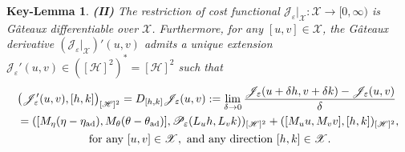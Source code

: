 \documentclass{sinst}
\numberwithin{equation}{section}
\theoremstyle{plain}
\newtheorem{keylem}{Key-Lemma}
\theoremstyle{definition}
\def\sH{\mathscr{H}}
\def\sJ{\mathscr{J}}
\def\sP{\mathscr{P}}
\def\sX{\mathscr{X}}
\begin{document}
\begin{keylem}
  \noindent
  \textbf{(II)} The restriction of cost functional $\sJ_\varepsilon|_\sX:\sX \longrightarrow [0,\infty)$ is G\^{a}teaux differentiable over $\sX$. Furthermore, for any $[u,v] \in \sX$, the G\^{a}teaux derivative $(\sJ_\varepsilon|_\sX)'(u,v)$ admits a unique extension $\sJ_\varepsilon'(u,v) \in ([\sH]^2)^* = [\sH]^2$ such that
  \begin{gather}
    \begin{aligned}
      &\bigl(\sJ_\varepsilon'(u,v), [h,k] \bigr)_{[\sH]^2} = D_{[h,k]} \sJ_\varepsilon(u,v) := \lim_{\delta \to 0} \frac{\sJ_\varepsilon(u + \delta h, v + \delta k) - \sJ_\varepsilon(u,v)}{\delta}
      \\
      &= ([M_\eta(\eta - \eta_{\rm ad}), M_\theta(\theta - \theta_{\rm ad})], \sP_\varepsilon(L_u h,L_v k))_{[\sH]^2} + ([M_u u,M_v v], [h,k])_{[\sH]^2},
    \end{aligned}
    \\
    \mbox{ for any } [u,v] \in \sX, \mbox{ and any direction } [h,k] \in \sX.
  \end{gather}
  
\end{keylem}
\end{document}
